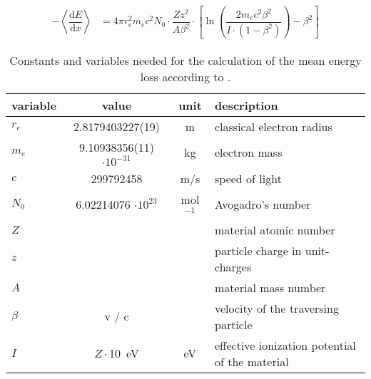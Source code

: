 \documentclass[
twoside,            %
BCOR1.4cm,          %
10pt,               %
headings=normal,    %
headsepline,        %
clearplainpage,		%
final,              %
div=14,
open=right,
bibliography=toc
]{scrreprt}
\begin{document}
\begin{table}[!h]
	\centering
	\begin{align}
		-\left\langle\dfrac{\mathrm{d}E}{\mathrm{d}x}\right\rangle &= 
			4\pi r_{e}^{2} m_{e} c^{2} N_{0}
			\cdot \dfrac{Z z^{2}}{A \beta^{2}}
			\cdot\left[\ln\left(\dfrac{2m_{e}c^{2}\beta^{2}}{I\cdot\left(1-\beta^{2}\right)}\right)-\beta^{2}\right]
			\label{BetheBlochFormula}
	\end{align}
			
	\begin{tabular}{lccl}
		\hline
		\hline
		variable & value & unit & description
		\\
		\hline
		$r_{e}$ & 2.8179403227(19) & m & classical electron radius
		\\
		$m_{e}$ & 9.10938356(11) $\cdot 10^{-31}$ & kg & electron mass
		\\
		$c$ & 299792458 & m/s & speed of light
		\\
		$N_{0}$ & 6.02214076 $\cdot10^{23}$ & mol$^{-1}$ & Avogadro's number
		\\
		$Z$ &  &  & material atomic number
		\\
		$z$ &  &  & particle charge in unit-charges
		\\
		$A$ &  &  & material mass number
		\\
		$\beta$ & v / c &  & velocity of the traversing particle
		\\
		$I$ & $Z \cdot$\SI{10}{eV} & eV & effective ionization potential of the material
		\\
		\hline
		\hline
	\end{tabular}
	
	\caption{
		Constants and variables needed for the calculation of the mean energy loss according to
		\cite{betheMaterieDurchgang}.
	}
\end{table}
\end{document}
